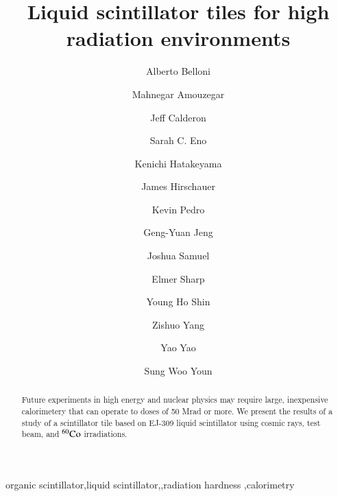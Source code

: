 \documentclass[review]{elsarticle}
\begin{document}
\begin{frontmatter}

\title{Liquid scintillator tiles for high radiation environments }


\author[umd]{Alberto Belloni}
\author[umd]{Mahnegar Amouzegar}
\author[umd]{Jeff Calderon}
\author[umd]{Sarah C. Eno}
\author[baylor]{Kenichi Hatakeyama}
\author[fnal]{James Hirschauer}
\author[fnal]{Kevin Pedro}
\author[umd]{Geng-Yuan Jeng}
\author[umd]{Joshua Samuel}
\author[elmer]{Elmer Sharp}
\author[umd]{Young Ho Shin}
\author[umd]{Zishuo Yang}
\author[umd]{Yao Yao}
\author[korea]{Sung Woo Youn}




\address[umd]{Dept. Physics, U. Maryland, College Park MD 30742 USA}
\address[eljen]{Eljen Technology, 1300 W. Broadway, Sweetwater, Tx 79556 USA}
\address[korea]{Institute for Basic Science, Center for Axion and Precision Physics Research, IBS Center for Axion and Precision Physics Research
Room 4315, Department of Physics, Natural Science Building (E6-2), KAIST,
291 Daehak-ro, Yuseong-gu, Daejeon 305-701, South Korea}
\address[elmer]{Elmer Sharp Engineering, 7007 Leesville Blvd. Springfield, VA 22151}
\address[fnal]{Fermi National Accelerator Laboratory, Batavia, IL, USA}
\address[baylor]{Baylor University, Waco, Texas, USA}

\begin{abstract}
Future experiments in high energy and nuclear physics may require large, inexpensive calorimetery that can operate to doses of 50 Mrad or more.
We present the results of a study of a scintillator tile based on EJ-309 liquid scintillator using cosmic rays, test beam, and $\rm{^{60}Co}$ irradiations. 
\end{abstract}

\begin{keyword}
organic scintillator\sep liquid scintillator\sep \sep radiation hardness \sep calorimetry
\end{keyword}

\end{frontmatter}

\linenumbers
\end{document}
